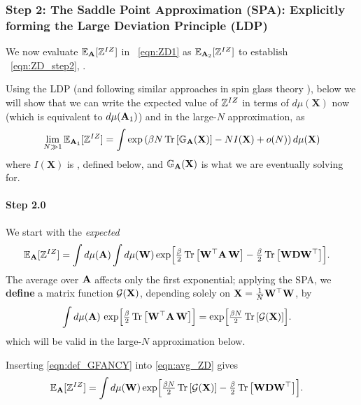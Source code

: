 \subsubsection{Step 2: The Saddle Point Approximation (SPA): Explicitly forming the Large Deviation Principle (LDP)}
\label{sxn:tanaka_step2}
We now evaluate $\mathbb{E}_{\mathbf{A}}[\mathbb{Z}^{IZ}]$ in \EQN~\ref{eqn:ZD1} as $\mathbb{E}_{\mathbf{A}_2}[\mathbb{Z}^{IZ}]$ 
to  establish \EQN~\ref{eqn:ZD_step2}, .

Using the LDP (and following similar approaches in spin glass theory \cite{PP95}),
below we will show that we can write the expected value of $\mathbb{Z}^{IZ}$ 
in terms of $d\mu(\mathbf{X})$ now (which is equivalent to $d\mu(\mathbf{A}_{1})$)
and in the large-$N$ approximation, as
\begin{equation}
  \label{eqn:LDP}
 \lim_{N \gg 1} \mathbb{E}_{\mathbf{A}_1}[\mathbb{Z}^{IZ}]=
  \int\exp\left(\beta N \mbox{}\operatorname{Tr}\left[\mathbb{G}_{\mathbf{A}}(\mathbf{X})\right]-NI(\mathbf{X})+o(N)\right)d\mu(\mathbf{X})
\end{equation}
where $I(\mathbf{X})$ is  \RateFunction, defined below,
and  $\mathbb{G}_{\mathbf{A}}(\mathbf{X})$ is what we are eventually solving for.

\paragraph{Step 2.0} We start with the \emph{expected} \PartitionFunction
\begin{align}
  \label{eqn:avg_ZD}
  \mathbb{E}_{\mathbf{A}}[\mathbb{Z}^{IZ}]
  &=
  \int d\mu(\mathbf{A})\int  d\mu({\mathbf{W}})
      \exp\Bigl[
         \tfrac{\beta}{2}\mbox{}\operatorname{Tr}\left[{\mathbf{W}}^{\top}\mathbf{A}\,{\mathbf{W}}\right]
        -\tfrac{\beta}{2}\mbox{}\operatorname{Tr}\left[{\mathbf{W}}\mathbf{D}{\mathbf{W}}^{\top}\right]
      \Bigr].
\end{align}
The average over $\mathbf{A}$ affects only the first exponential; applying the SPA, we
\textbf{define} a matrix function $\mathcal{G}(\mathbf{X})$, depending solely on
$\mathbf{X}=\frac1N{\mathbf{W}}^{\top}{\mathbf{W}}$, by
\begin{align}
  \label{eqn:def_GFANCY}
  \int d\mu(\mathbf{A})\,
        \exp\Bigl[\tfrac{\beta}{2}\mbox{}\operatorname{Tr}\left[{\mathbf{W}}^{\top}\mathbf{A}\,{\mathbf{W}}\right]\Bigr]
  &=
  \exp\Bigl[\tfrac{\beta N}{2}\mbox{}\operatorname{Tr}\left[\mathcal{G}(\mathbf{X})\right]\Bigr].
\end{align}
which will be valid in the large-$N$ approximation below.

Inserting \eqref{eqn:def_GFANCY} into \eqref{eqn:avg_ZD} gives
\begin{align}
  \label{eqn:ZD_after_Aavg}
  \mathbb{E}_{\mathbf{A}}[\mathbb{Z}^{IZ}]
  &=
  \int d\mu({\mathbf{W}})
      \exp\Bigl[
         \tfrac{\beta N}{2}\mbox{}\operatorname{Tr}\left[\mathcal{G}(\mathbf{X})\right]
        -\tfrac{\beta}{2}\mbox{}\operatorname{Tr}\left[{\mathbf{W}}\mathbf{D}{\mathbf{W}}^{\top}\right]
      \Bigr].
\end{align}

